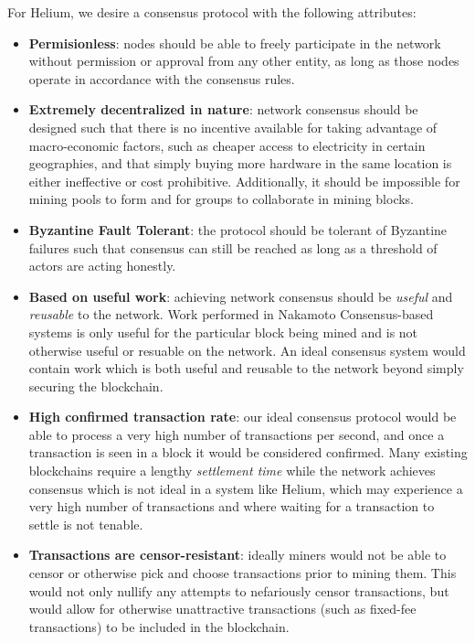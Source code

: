\documentclass[10pt, nonatbib, nocopyrightspace, reprint]{sigplanconf}
\begin{document}
For Helium, we desire a consensus protocol with the following attributes:

\begin{itemize}
  \item \textbf{Permisionless}: nodes should be able to freely participate in the network without permission or approval from any other entity, as long as those nodes operate in accordance with the consensus rules.
  \item \textbf{Extremely decentralized in nature}: network consensus should be designed such that there is no incentive available for taking advantage of macro-economic factors, such as cheaper access to electricity in certain geographies, and that simply buying more hardware in the same location is either ineffective or cost prohibitive. Additionally, it should be impossible for mining pools to form and for groups to collaborate in mining blocks.
  \item \textbf{Byzantine Fault Tolerant}: the protocol should be tolerant of Byzantine failures \cite{byzantine-failures} such that consensus can still be reached as long as a threshold of actors are acting honestly. 
  \item \textbf{Based on useful work}: achieving network consensus should be \emph{useful} and \emph{reusable} to the network. Work performed in Nakamoto Consensus-based systems is only useful for the particular block being mined and is not otherwise useful or resuable on the network. An ideal consensus system would contain work which is both useful and reusable to the network beyond simply securing the blockchain.
  \item \textbf{High confirmed transaction rate}: our ideal consensus protocol would be able to process a very high number of transactions per second, and once a transaction is seen in a block it would be considered confirmed. Many existing blockchains require a lengthy \emph{settlement time} while the network achieves consensus which is not ideal in a system like Helium, which may experience a very high number of transactions and where waiting for a transaction to settle is not tenable.
  \item \textbf{Transactions are censor-resistant}: ideally miners would not be able to censor or otherwise pick and choose transactions prior to mining them. This would not only nullify any attempts to nefariously censor transactions, but would allow for otherwise unattractive transactions (such as fixed-fee transactions) to be included in the blockchain.
\end{itemize}
\end{document}

